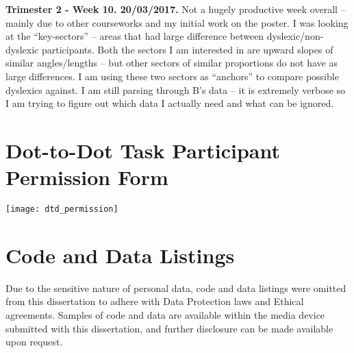 \begin{appendices}
		\textbf{Trimester 2 - Week 10. 20/03/2017.}
		Not a hugely productive week overall – mainly due to other courseworks and my initial work on the poster.
		I was looking at the “key-sectors” – areas that had large difference between dyslexic/non-dyslexic participants.
		Both the sectors I am interested in are upward slopes of similar angles/lengths – but other sectors of similar proportions do not have as large differences.
		I am using these two sectors as “anchors” to compare possible dyslexics against.
		I am still parsing through B’s data – it is extremely verbose so I am trying to figure out which data I actually need and what can be ignored.
		
	\section{Dot-to-Dot Task Participant Permission Form}
		\texttt{[image: dtd\_permission]}
		
	\section{Code and Data Listings}
		Due to the sensitive nature of personal data, code and data listings were omitted from this dissertation to adhere with Data Protection laws and Ethical agreements. Samples of code and data are available within the media device submitted with this dissertation, and further disclosure can be made available upon request.
	
\end{appendices}